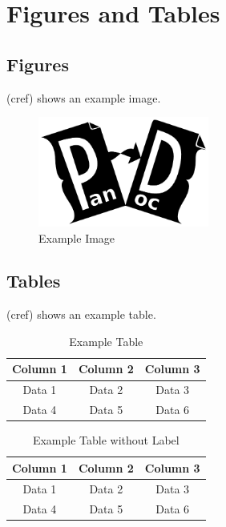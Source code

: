 \documentclass{article}
\begin{document}
\section{Figures and Tables\label{sec:figures_tables}}

\subsection{Figures}
 (cref) shows an example image.

\begin{figure}[H]
    \centering
    \includegraphics[width=0.5\textwidth]{./example-image}
    \caption{Example Image}
    \label{fig:example}
\end{figure}

\subsection{Tables}
 (cref) shows an example table.

\begin{table}[H]
    \centering
    \begin{tabular}{|c|c|c|}
        \hline
        Column 1 & Column 2 & Column 3 \\
        \hline
        Data 1 & Data 2 & Data 3 \\
        Data 4 & Data 5 & Data 6 \\
        \hline
    \end{tabular}
    \caption{Example Table}
    \label{tab:example}
\end{table}

\begin{table}[H]
    \centering
    \begin{tabular}{|c|c|c|}
        \hline
        Column 1 & Column 2 & Column 3 \\
        \hline
        Data 1 & Data 2 & Data 3 \\
        Data 4 & Data 5 & Data 6 \\
        \hline
    \end{tabular}
    \caption{Example Table without Label}
\end{table}
\end{document}
